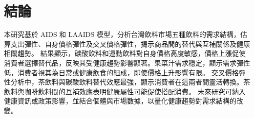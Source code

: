 \section{結論} \label{conclusion}






本研究基於 AIDS 和 LAAIDS 模型，分析台灣飲料市場五種飲料的需求結構，估算支出彈性、自身價格彈性及交叉價格彈性，揭示商品間的替代與互補關係及健康相關趨勢。
結果顯示，碳酸飲料和運動飲料對自身價格高度敏感，價格上漲促使消費者選擇替代品，反映其受健康趨勢影響顯著。果菜汁需求穩定，顯示需求彈性低，消費者視其為日常或健康飲食的組成，即使價格上升影響有限。
交叉價格彈性分析中，茶飲料與碳酸飲料替代效應最強，顯示消費者在這兩者間靈活轉換。茶飲料與咖啡飲料間的互補效應表明健康屬性可能促使搭配消費。
未來研究可納入健康資訊或政策影響，並結合個體與市場數據，以量化健康趨勢對需求結構的改變。
